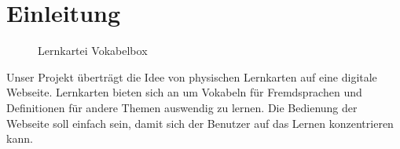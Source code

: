 \section{Einleitung}
\begin{figure}[h!]
  \centering
  \caption[Lernkartei Vokabelbox]{Lernkartei Vokabelbox\footnotemark}
\end{figure}

\noindent Unser Projekt überträgt die Idee von physischen Lernkarten auf eine digitale Webseite. Lernkarten bieten sich an um Vokabeln für Fremdsprachen und Definitionen für andere Themen auswendig zu lernen. Die Bedienung der Webseite soll einfach sein, damit sich der Benutzer auf das Lernen konzentrieren kann. 